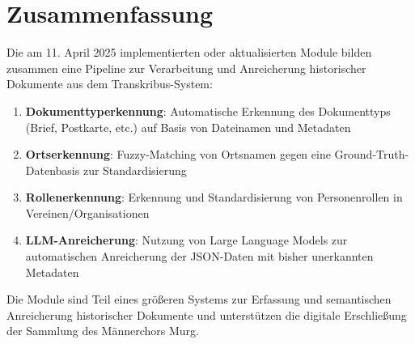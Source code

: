 \documentclass{article}
\begin{document}
\section{Zusammenfassung}

Die am 11. April 2025 implementierten oder aktualisierten Module bilden zusammen eine Pipeline zur Verarbeitung und Anreicherung historischer Dokumente aus dem Transkribus-System:

\begin{enumerate}
    \item \textbf{Dokumenttyperkennung}: Automatische Erkennung des Dokumenttyps (Brief, Postkarte, etc.) auf Basis von Dateinamen und Metadaten
    \item \textbf{Ortserkennung}: Fuzzy-Matching von Ortsnamen gegen eine Ground-Truth-Datenbasis zur Standardisierung
    \item \textbf{Rollenerkennung}: Erkennung und Standardisierung von Personenrollen in Vereinen/Organisationen
    \item \textbf{LLM-Anreicherung}: Nutzung von Large Language Models zur automatischen Anreicherung der JSON-Daten mit bisher unerkannten Metadaten
\end{enumerate}

Die Module sind Teil eines größeren Systems zur Erfassung und semantischen Anreicherung historischer Dokumente und unterstützen die digitale Erschließung der Sammlung des Männerchors Murg.
\end{document}
